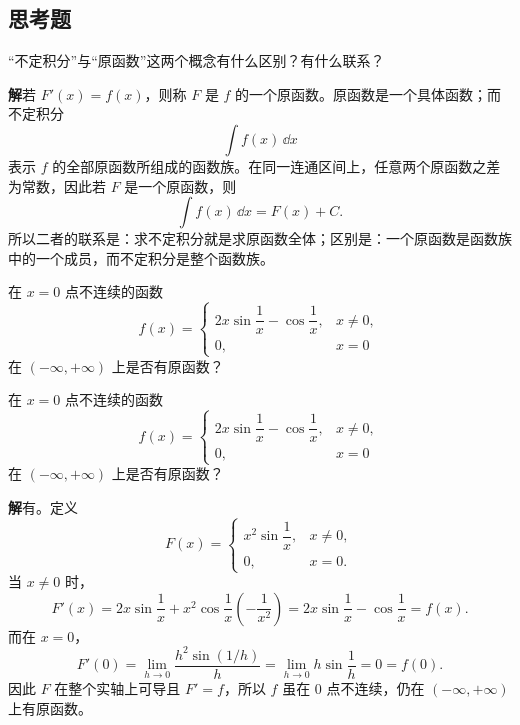 \subsection{思考题}

\begin{xthought}[1]
“不定积分”与“原函数”这两个概念有什么区别？有什么联系？
\end{xthought}
\begin{xsolution}
\textbf{解}\quad 若 $F'(x)=f(x)$，则称 $F$ 是 $f$ 的一个原函数。原函数是一个具体函数；而不定积分
  \[
    \int f(x)\,\dd x
  \]
  表示 $f$ 的全部原函数所组成的函数族。在同一连通区间上，任意两个原函数之差为常数，因此若 $F$ 是一个原函数，则
  \[
    \int f(x)\,\dd x=F(x)+C.
  \]
  所以二者的联系是：求不定积分就是求原函数全体；区别是：一个原函数是函数族中的一个成员，而不定积分是整个函数族。
\end{xsolution}


\begin{xthought}[2]
在 $x=0$ 点不连续的函数
  \[
    f(x)=
    \begin{cases}
      2x\sin\dfrac1x-\cos\dfrac1x, & x\ne0,\\
      0, & x=0
    \end{cases}
  \]
  在 $(-\infty,+\infty)$ 上是否有原函数？
\end{xthought}
\begin{xsolution}
在 $x=0$ 点不连续的函数
  \[
    f(x)=
    \begin{cases}
      2x\sin\dfrac1x-\cos\dfrac1x,&x\ne0,\\
      0,&x=0
    \end{cases}
  \]
  在 $(-\infty,+\infty)$ 上是否有原函数？

  \textbf{解}\quad 有。定义
  \[
    F(x)=
    \begin{cases}
      x^2\sin\dfrac1x,&x\ne0,\\
      0,&x=0.
    \end{cases}
  \]
  当 $x\ne0$ 时，
  \[
    F'(x)=2x\sin\frac1x+x^2\cos\frac1x\left(-\frac1{x^2}\right)
    =2x\sin\frac1x-\cos\frac1x=f(x).
  \]
  而在 $x=0$，
  \[
    F'(0)=\lim_{h\to0}\frac{h^2\sin(1/h)}{h}
    =\lim_{h\to0}h\sin\frac1h=0=f(0).
  \]
  因此 $F$ 在整个实轴上可导且 $F'=f$，所以 $f$ 虽在 $0$ 点不连续，仍在 $(-\infty,+\infty)$ 上有原函数。
\end{xsolution}


